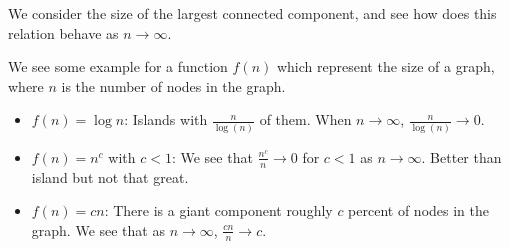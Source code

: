We consider the size of the largest connected component, and see how does this relation behave as \(n\to \infty\).
\begin{eg}
	We see some example for a function \(f(n)\) which represent the size of a graph, where \(n\) is the number of nodes in the graph.
	\begin{itemize}
		\item \(f(n) = \log n\): Islands with \(\frac{n}{\log(n)}\) of them. When \(n\to \infty \), \(\frac{n}{\log(n)}\to 0\).
		      \begin{figure}[H]
			      \centering
			      \label{fig:random-graph-logn}
		      \end{figure}
		\item \(f(n) = n^c\) with \(c<1\): We see that \(\frac{n^c}{n}\to 0\) for \(c<1\) as \(n\to \infty \). Better than island but not that great.
		      \begin{figure}[H]
			      \centering
			      \label{fig:random-graph-n^c}
		      \end{figure}
		\item \(f(n) = cn\): There is a giant component roughly \(c\) percent of nodes in the graph. We see that as \(n\to \infty \), \(\frac{cn}{n}\to c\).
		      \begin{figure}[H]
			      \centering
			      \label{fig:random-graph-cn}
		      \end{figure}
	\end{itemize}
\end{eg}
